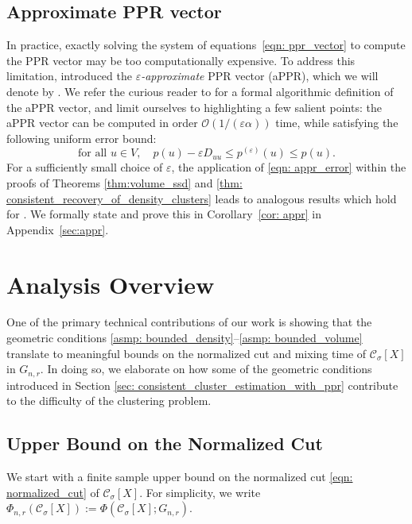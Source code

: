 \documentclass[11pt,twoside]{article}
\newcommand{\1}{\mathbf{1}}
\newcommand{\pbf}{p}        %
\newcommand{\Xbf}{X}             %
\newcommand{\Dbf}{D}
\newcommand{\Cset}{\mathcal{C}}
\newcommand{\Csig}{\Cset_{\sigma}}
\begin{document}
\subsection{Approximate PPR vector} 
In practice, exactly solving the system of equations~\eqref{eqn:
  ppr_vector} to compute the PPR vector 
  may be too computationally expensive. To address this limitation,
\citet{andersen2006} introduced the \emph{$\varepsilon$-approximate} PPR vector
(aPPR), which we will denote by \smash{$\pbf^{(\varepsilon)}$}. We refer the
curious reader to \citet{andersen2006} for a formal algorithmic definition of
the aPPR vector, and limit ourselves to highlighting a few salient points: the
aPPR vector can be computed in order $\mathcal{O}(1/(\varepsilon\alpha))$ time,
while satisfying the following uniform error bound: 
\begin{equation}
\label{eqn: appr_error}
\textrm{for all $u \in V$}, \quad \pbf(u) - \varepsilon \Dbf_{uu}\leq
\pbf^{(\varepsilon)}(u) \leq \pbf(u).  
\end{equation}
For a sufficiently small choice of $\varepsilon$, the 
application of \eqref{eqn: appr_error} within the proofs of Theorems \ref{thm:volume_ssd} and \ref{thm: consistent_recovery_of_density_clusters}
leads to analogous results which hold for \smash{$\pbf^{(\varepsilon)}$}. We
formally state and prove this in Corollary~\ref{cor: appr} in 
Appendix~\ref{sec:appr}.

\section{Analysis Overview}
\label{sec: analysis}

One of the primary technical contributions of our work is showing that the geometric
conditions \ref{asmp: bounded_density}--\ref{asmp: bounded_volume} translate to 
meaningful bounds on the normalized cut and mixing time of $\Csig[\Xbf]$ in
$G_{n,r}$. In doing so, we elaborate on how some of the geometric conditions
introduced in Section \ref{sec: consistent_cluster_estimation_with_ppr}
contribute to the difficulty of the clustering problem. 

\subsection{Upper Bound on the Normalized Cut} 
We start with a finite sample upper bound on the
normalized cut \eqref{eqn: normalized_cut} of $\Cset_\sigma[\Xbf]$. For
simplicity, we write $\Phi_{n,r}(\Csig[\Xbf]) := \Phi(\Csig[\Xbf]; G_{n,r})$. 
\end{document}
